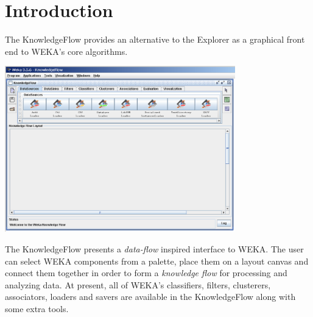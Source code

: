%
%
%
%



\section{Introduction}

The KnowledgeFlow provides an alternative to the Explorer as a
graphical front end to WEKA's core algorithms. 

\begin{center}
  \includegraphics[angle=270,width=10cm]{images/knowledgeflow/knowledgeflow.eps}
\end{center}

The KnowledgeFlow presents a \textit{data-flow} inspired interface to
WEKA. The user can select WEKA components from a palette, place them
on a layout canvas and connect them together in order to form a
\textit{knowledge flow} for processing and analyzing data. At present,
all of WEKA's classifiers, filters, clusterers, associators, loaders
and savers are available in the KnowledgeFlow along with some extra
tools.

